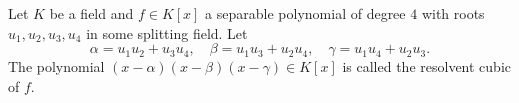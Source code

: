 Let $K$ be a field and $f \in K[x]$ a separable polynomial of degree $4$ with roots $u_1, u_2, u_3, u_4$ in some splitting field. Let
$$\alpha = u_1u_2 + u_3u_4, \quad \beta = u_1u_3 + u_2u_4, \quad \gamma = u_1u_4 + u_2u_3.$$
The polynomial $(x - \alpha)(x - \beta)(x - \gamma) \in K[x]$ is called the resolvent cubic of $f$.
